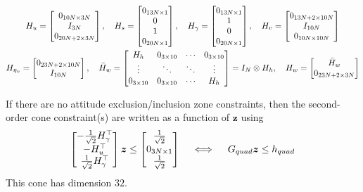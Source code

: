 \documentclass[10pt]{article}
\begin{document}
\begin{gather*}
H_u = \begin{bmatrix}
0_{10N \times 3N} \\ I_{3N} \\ 0_{20N+2 \times 3N}
\end{bmatrix}, \quad H_s = \begin{bmatrix}
0_{13N \times 1} \\ 0 \\ 1 \\ 0_{20N \times 1}
\end{bmatrix}, \quad H_{\gamma} = \begin{bmatrix}
0_{13N \times 1} \\ 1 \\ 0 \\ 0_{20N \times 1}
\end{bmatrix}, \quad H_v = \begin{bmatrix}
0_{13N+2 \times 10N} \\ I_{10N} \\ 0_{10N \times 10N} 
\end{bmatrix}  \\
H_{\eta_v} = \begin{bmatrix}
0_{23N+2 \times 10N} \\ I_{10N}
\end{bmatrix}, \quad
\bar{H}_w = \begin{bmatrix}
H_h & 0_{3 \times 10} & \cdots & 0_{3 \times 10} \\
\vdots & \ddots & \ddots & \vdots \\
0_{3 \times 10} & 0_{3 \times 10} & \cdots & H_h
\end{bmatrix} = I_{N} \otimes H_h, \quad H_w = \begin{bmatrix}
\bar{H}_w \\ 0_{23N+2 \times 3N} 
\end{bmatrix}
\end{gather*}

If there are no attitude exclusion/inclusion zone constraints, then the second-order cone constraint(s) are written as a function of $\bm{z}$ using
\begin{equation}
\begin{bmatrix}
-\frac{1}{\sqrt{2}}H_{\gamma}^{\top} \\ -H_u^{\top} \\ \frac{1}{\sqrt{2}} H_{\gamma}^{\top}
\end{bmatrix} \bm{z} \leq \begin{bmatrix} 
\frac{1}{\sqrt{2}} \\ 0_{3N \times 1} \\ \frac{1}{\sqrt{2}}
\end{bmatrix} \quad \iff \quad G_{quad} \bm{z} \leq h_{quad}
\label{eq:std_b_quad}
\end{equation}
This cone has dimension $32$. 
\end{document}

